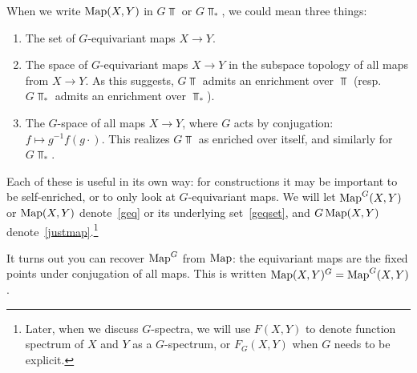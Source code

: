 When we write $\operatorname{Map}(X, Y)$ in $G\Top$ or $G\Top_*$, we could mean three things:
\begin{enumerate}
	\item\label{geqset} The set of $G$-equivariant maps $X\to Y$.
	\item\label{geq} The space of $G$-equivariant maps $X\to Y$ in the subspace topology of all maps from $X\to Y$.
	As this suggests, $G\Top$ admits an enrichment over $\Top$ (resp.\ $G\Top_*$ admits an enrichment over
	$\Top_*$).
	\item\label{justmap} The $G$-space of all maps $X\to Y$, where $G$ acts by conjugation: $f\mapsto
	g^{-1}f(g\cdot)$. This realizes $G\Top$ as enriched over itself, and similarly for $G\Top_*$.
\end{enumerate}
Each of these is useful in its own way: for constructions it may be important to be self-enriched, or to only look
at $G$-equivariant maps. We will let $\operatorname{Map}^G(X,Y)$ or $\operatorname{Map}(X,Y)$ denote~\eqref{geq} or its underlying
set~\eqref{geqset}, and $G\operatorname{Map}(X,Y)$ denote~\eqref{justmap}.\footnote{Later, when we discuss $G$-spectra, we will
use $F(X, Y)$ to denote function spectrum of $X$ and $Y$ as a $G$-spectrum, or $F_G(X,Y)$ when $G$ needs to be
explicit.}

It turns out you can recover $\operatorname{Map}^G$ from $\operatorname{Map}$: the equivariant maps are the fixed points under conjugation of
all maps. This is written $\operatorname{Map}(X,Y)^G = \operatorname{Map}^G(X,Y)$.

